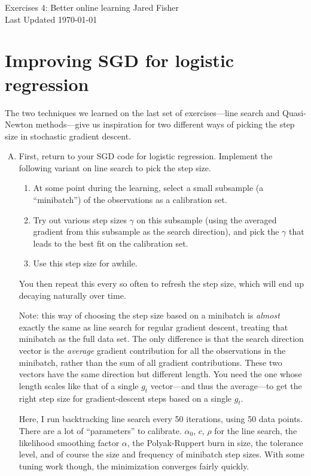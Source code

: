 \documentclass{article}
\begin{document}
\large 
\begin{center}
Exercises 4: Better online learning
\vspace{10pt}
Jared Fisher\\
Last Updated \today
\end{center}
\normalsize


\section{Improving SGD for logistic regression}

The two techniques we learned on the last set of exercises---line search and Quasi-Newton methods---give us inspiration for two different ways of picking the step size in stochastic gradient descent.

\begin{enumerate}[(A)]

\item First, return to your SGD code for logistic regression.  Implement the following variant on line search to pick the step size.
\begin{enumerate}[1.]
\item At some point during the learning, select a small subsample (a ``minibatch'') of the observations as a calibration set.
\item Try out various step sizes $\gamma$ on this subsample (using the averaged gradient from this subsample as the search direction), and pick the $\gamma$ that leads to the best fit on the calibration set.
\item Use this step size for awhile.
\end{enumerate}
You then repeat this every so often to refresh the step size, which will end up decaying naturally over time.

Note: this way of choosing the step size based on a minibatch is \textit{almost} exactly the same as line search for regular gradient descent, treating that minibatch as the full data set.  The only difference is that the search direction vector is the \textit{average} gradient contribution for all the observations in the minibatch, rather than the sum of all gradient contributions.  These two vectors have the same direction but different length.  You need the one whose length scales like that of a single $g_t$ vector---and thus the average---to get the right step size for gradient-descent steps based on a single $g_t$.

\color{blue}
Here, I run backtracking line search every 50 iterations, using 50 data points. There are a lot of ``parameters'' to calibrate. $\alpha_0$, $c$, $\rho$ for the line search, the likelihood smoothing factor $\alpha$, the Polyak-Ruppert burn in size, the tolerance level, and of course the size and frequency of minibatch step sizes. With some tuning work though, the minimization converges fairly quickly. 


\end{enumerate}
\end{document}
